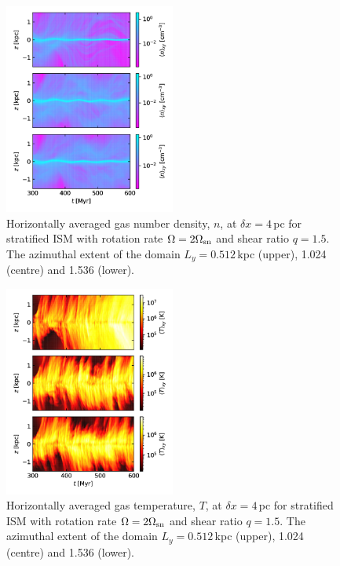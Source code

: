 \documentclass[iop,apj,numberedappendix,twocolappendix]{emulateapj}
\newcommand{\dx}{\delta x}
\begin{document}
\begin{figure}
\centering
\includegraphics[trim=0.0cm 0.0cm 0.0cm 0.0cm,clip=true,width=0.5\textwidth]{csc_figs/av-rhomzsm.pdf}
\caption{
Horizontally averaged gas number density, $n$, at $\dx=4$\,pc for 
stratified ISM with rotation rate $\Omega=2\Omega_{\rm sn}$ and shear ratio
$q=1.5$.
The azimuthal extent of the domain $L_y=0.512$\,kpc (upper), 1.024 (centre) 
and 1.536 (lower). 
\label{fig:lsd-rhomz}
}
\end{figure}

\begin{figure}
\centering
\includegraphics[trim=0.0cm 0.0cm 0.0cm 0.0cm,clip=true,width=0.5\textwidth]{csc_figs/av-ttmzsm.pdf}
\caption{
Horizontally averaged gas temperature, $T$, at $\dx=4$\,pc for 
stratified ISM with rotation rate $\Omega=2\Omega_{\rm sn}$ and shear ratio
$q=1.5$.
The azimuthal extent of the domain $L_y=0.512$\,kpc (upper), 1.024 (centre) 
and 1.536 (lower). 
\label{fig:lsd-ttmz}
}
\end{figure}
\end{document}
